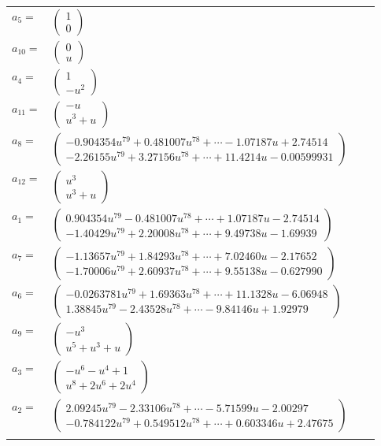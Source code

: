 \documentclass[1p]{elsarticle_modified}
\theoremstyle{definition}
\begin{document}
\begin{tabular}{m{7pt} m{180pt} m{7pt} m{180pt} }
\flushright $a_{5}=$&$\begin{pmatrix}1\\0\end{pmatrix}$ \\
\flushright $a_{10}=$&$\begin{pmatrix}0\\u\end{pmatrix}$ \\
\flushright $a_{4}=$&$\begin{pmatrix}1\\- u^2\end{pmatrix}$ \\
\flushright $a_{11}=$&$\begin{pmatrix}- u\\u^3+u\end{pmatrix}$ \\
\flushright $a_{8}=$&$\begin{pmatrix}-0.904354 u^{79}+0.481007 u^{78}+\cdots-1.07187 u+2.74514\\-2.26155 u^{79}+3.27156 u^{78}+\cdots+11.4214 u-0.00599931\end{pmatrix}$ \\
\flushright $a_{12}=$&$\begin{pmatrix}u^3\\u^3+u\end{pmatrix}$ \\
\flushright $a_{1}=$&$\begin{pmatrix}0.904354 u^{79}-0.481007 u^{78}+\cdots+1.07187 u-2.74514\\-1.40429 u^{79}+2.20008 u^{78}+\cdots+9.49738 u-1.69939\end{pmatrix}$ \\
\flushright $a_{7}=$&$\begin{pmatrix}-1.13657 u^{79}+1.84293 u^{78}+\cdots+7.02460 u-2.17652\\-1.70006 u^{79}+2.60937 u^{78}+\cdots+9.55138 u-0.627990\end{pmatrix}$ \\
\flushright $a_{6}=$&$\begin{pmatrix}-0.0263781 u^{79}+1.69363 u^{78}+\cdots+11.1328 u-6.06948\\1.38845 u^{79}-2.43528 u^{78}+\cdots-9.84146 u+1.92979\end{pmatrix}$ \\
\flushright $a_{9}=$&$\begin{pmatrix}- u^3\\u^5+u^3+u\end{pmatrix}$ \\
\flushright $a_{3}=$&$\begin{pmatrix}- u^6- u^4+1\\u^8+2 u^6+2 u^4\end{pmatrix}$ \\
\flushright $a_{2}=$&$\begin{pmatrix}2.09245 u^{79}-2.33106 u^{78}+\cdots-5.71599 u-2.00297\\-0.784122 u^{79}+0.549512 u^{78}+\cdots+0.603346 u+2.47675\end{pmatrix}$\\&\end{tabular}
\end{document}
